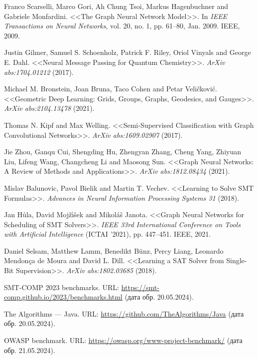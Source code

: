 \begin{thebibliography}{1}
 Franco Scarselli, Marco Gori, Ah Chung Tsoi, Markus Hagenbuchner and Gabriele Monfardini. <<The Graph Neural Network Model>>. In \textit{IEEE Transactions on Neural Networks}, vol. 20, no. 1, pp. 61--80, Jan. 2009. IEEE, 2009.

 Justin Gilmer, Samuel S. Schoenholz, Patrick F. Riley, Oriol Vinyals and George E. Dahl. <<Neural Message Passing for Quantum Chemistry>>. \textit{ArXiv abs:1704.01212} (2017).

 Michael M. Bronstein, Joan Bruna, Taco Cohen and Petar Veli\v{c}kovi\'{c}. <<Geometric Deep Learning: Grids, Groups, Graphs, Geodesics, and Gauges>>. \textit{ArXiv abs:2104.13478} (2021).

 Thomas N. Kipf and Max Welling. <<Semi-Supervised Classification with Graph Convolutional Networks>>. \textit{ArXiv abs:1609.02907} (2017).

 Jie Zhou, Ganqu Cui, Shengding Hu, Zhengyan Zhang, Cheng Yang, Zhiyuan Liu, Lifeng Wang, Changcheng Li and Maosong Sun. <<Graph Neural Networks: A Review of Methods and Applications>>. \textit{ArXiv abs:1812.08434} (2021).

 Mislav Balunovic, Pavol Bielik and Martin T. Vechev. <<Learning to Solve SMT Formulas>>. \textit{Advances in Neural Information Processing Systems 31} (2018).

 Jan H\r{u}la, David Moj\v{z}\'{\i}\v{s}ek and Mikol\'{a}\v{s} Janota. <<Graph Neural Networks for Scheduling of SMT Solvers>>. \textit{IEEE 33rd International Conference on Tools with Artificial Intelligence} (ICTAI '2021), pp. 447--451. IEEE, 2021.

 Daniel Selsam, Matthew Lamm, Benedikt B\"{u}nz, Percy Liang, Leonardo Mendonça de Moura and David L. Dill. <<Learning a SAT Solver from Single-Bit Supervision>>. \textit{ArXiv abs:1802.03685} (2018).

 SMT-COMP 2023 benchmarks. URL: \url{https://smt-comp.github.io/2023/benchmarks.html} (дата обр. 20.05.2024).

 The Algorithms --- Java. URL: \url{https://github.com/TheAlgorithms/Java} (дата обр. 20.05.2024).

 OWASP benchmark. URL: \url{https://owasp.org/www-project-benchmark/} (дата обр. 21.05.2024).


\end{thebibliography}
